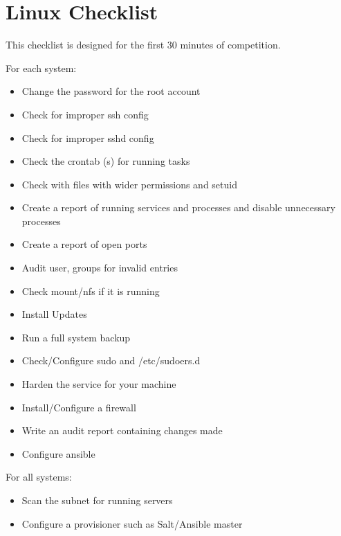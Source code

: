 \section{Linux Checklist}
This checklist is designed for the first 30 minutes of competition.

For each system:
\begin{itemize}
	\item Change the password for the root account
	\item Check for improper ssh config
	\item Check for improper sshd config
	\item Check the crontab (s) for running tasks
	\item Check with files with wider permissions and setuid
	\item Create a report of running services and processes and disable unnecessary processes
	\item Create a report of open ports
	\item Audit user, groups for invalid entries
	\item Check mount/nfs if it is running
	\item Install Updates
	\item Run a full system backup
	\item Check/Configure sudo and /etc/sudoers.d
	\item Harden the service for your machine
	\item Install/Configure a firewall
	\item Write an audit report containing changes made
	\item Configure ansible
\end{itemize}

For all systems:
\begin{itemize}
	\item Scan the subnet for running servers
	\item Configure a provisioner such as Salt/Ansible master
\end{itemize}
